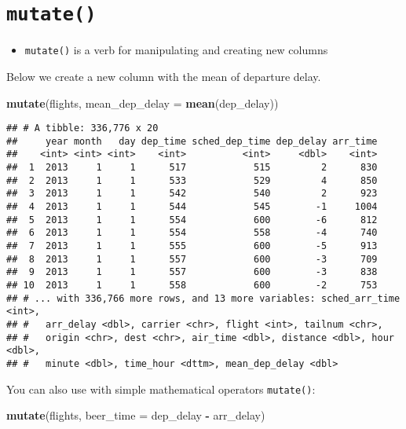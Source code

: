 \documentclass[]{book}
\newenvironment{Shaded}{\begin{snugshade}}{\end{snugshade}}
\newcommand{\DataTypeTok}[1]{\textcolor[rgb]{0.13,0.29,0.53}{#1}}
\newcommand{\KeywordTok}[1]{\textcolor[rgb]{0.13,0.29,0.53}{\textbf{#1}}}
\newcommand{\NormalTok}[1]{#1}
\newcommand{\OperatorTok}[1]{\textcolor[rgb]{0.81,0.36,0.00}{\textbf{#1}}}
\newcommand{\StringTok}[1]{\textcolor[rgb]{0.31,0.60,0.02}{#1}}
\providecommand{\tightlist}{%
  \setlength{\itemsep}{0pt}\setlength{\parskip}{0pt}}
\begin{document}
\hypertarget{mutate}{%
\section{\texorpdfstring{\texttt{mutate()}}{mutate()}}\label{mutate}}

\begin{itemize}
\tightlist
\item
  \texttt{mutate()} is a verb for manipulating and creating new columns
\end{itemize}

Below we create a new column with the mean of departure delay.

\begin{Shaded}
\begin{Highlighting}[]
\KeywordTok{mutate}\NormalTok{(flights, }\DataTypeTok{mean_dep_delay =} \KeywordTok{mean}\NormalTok{(dep_delay))}
\end{Highlighting}
\end{Shaded}

\begin{verbatim}
## # A tibble: 336,776 x 20
##     year month   day dep_time sched_dep_time dep_delay arr_time
##    <int> <int> <int>    <int>          <int>     <dbl>    <int>
##  1  2013     1     1      517            515         2      830
##  2  2013     1     1      533            529         4      850
##  3  2013     1     1      542            540         2      923
##  4  2013     1     1      544            545        -1     1004
##  5  2013     1     1      554            600        -6      812
##  6  2013     1     1      554            558        -4      740
##  7  2013     1     1      555            600        -5      913
##  8  2013     1     1      557            600        -3      709
##  9  2013     1     1      557            600        -3      838
## 10  2013     1     1      558            600        -2      753
## # ... with 336,766 more rows, and 13 more variables: sched_arr_time <int>,
## #   arr_delay <dbl>, carrier <chr>, flight <int>, tailnum <chr>,
## #   origin <chr>, dest <chr>, air_time <dbl>, distance <dbl>, hour <dbl>,
## #   minute <dbl>, time_hour <dttm>, mean_dep_delay <dbl>
\end{verbatim}

You can also use with simple mathematical operators \texttt{mutate()}:

\begin{Shaded}
\begin{Highlighting}[]
\KeywordTok{mutate}\NormalTok{(flights, }\DataTypeTok{beer_time =}\NormalTok{ dep_delay }\OperatorTok{-}\StringTok{ }\NormalTok{arr_delay)}
\end{Highlighting}
\end{Shaded}
\end{document}
